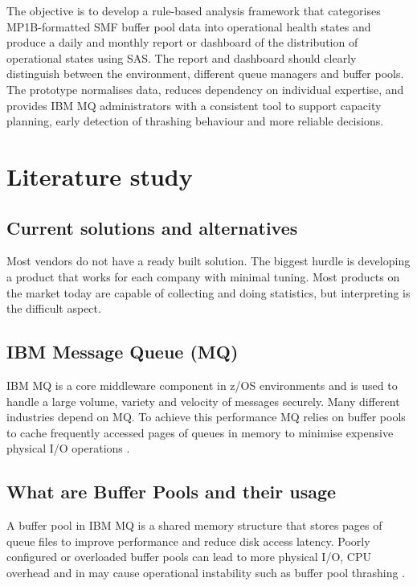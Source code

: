  The objective is to develop a rule-based analysis framework that categorises MP1B-formatted SMF buffer pool data into operational health states and produce a daily and monthly report or dashboard of the distribution of operational states using SAS. The report and dashboard should clearly distinguish between the environment, different queue managers and buffer pools. The prototype normalises data, reduces dependency on individual expertise, and provides IBM MQ administrators with a consistent tool to support capacity planning, early detection of thrashing behaviour and more reliable decisions.


\section{Literature study}%
\label{sec:literatuurstudie}

\subsection{Current solutions and alternatives}%
Most vendors do not have a ready built solution. The biggest hurdle is developing a product that works for each company with minimal tuning.
Most products on the market today are capable of collecting and doing statistics, but interpreting is the difficult aspect. 



\subsection{IBM Message Queue (MQ)}%
IBM MQ is a core middleware component in z/OS environments and is used to handle a large volume, variety and velocity of messages securely. Many different industries depend on MQ. To achieve this performance MQ relies on buffer pools to cache frequently accessed pages of queues in memory to minimise expensive physical I/O operations \autocite{ibm2026_mq}. 

\subsection{What are Buffer Pools and their usage}%
A buffer pool in IBM MQ is a shared memory structure that stores pages of queue files to improve performance and reduce disk access latency. Poorly configured or overloaded buffer pools can lead to more physical I/O, CPU overhead and in may cause operational instability such as buffer pool thrashing \autocite{Paice2020}.

